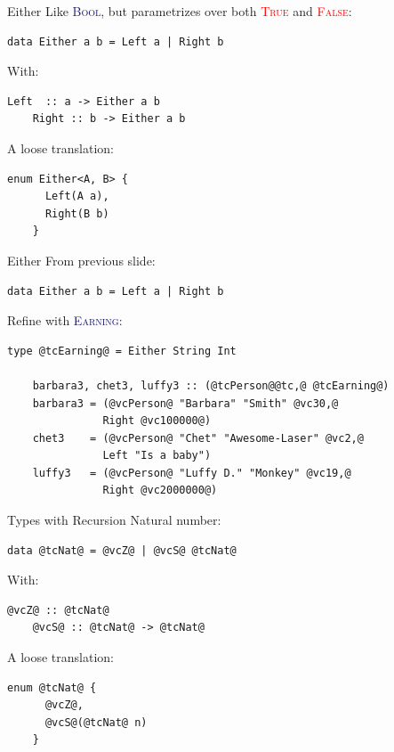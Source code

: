 \documentclass[xcolor={usenames,dvipsnames}]{beamer}
\newcommand{\htycon}[1]{\textcolor{MidnightBlue}{\textsc{#1}}}
\newcommand{\hvalcon}[1]{\textcolor{Red}{\textsc{#1}}}
\begin{document}
\begin{frame}[fragile]{Either}
  Like \htycon{Bool}, but parametrizes over both \hvalcon{True} and \hvalcon{False}:
  \begin{lstlisting}[style=hask]
    data Either a b = Left a | Right b
  \end{lstlisting}

  With:
  \begin{lstlisting}[style=hask]
    Left  :: a -> Either a b
    Right :: b -> Either a b
  \end{lstlisting}

  A loose translation:
  \begin{lstlisting}[style=hask]
    enum Either<A, B> {
      Left(A a),
      Right(B b)
    }
  \end{lstlisting}
\end{frame}

\begin{frame}[fragile]{Either}
  From previous slide:
  \begin{lstlisting}[style=hask]
    data Either a b = Left a | Right b
  \end{lstlisting}

  Refine with \htycon{Earning}:
  \begin{lstlisting}[style=hask]
    type @tcEarning@ = Either String Int

    barbara3, chet3, luffy3 :: (@tcPerson@@tc,@ @tcEarning@)
    barbara3 = (@vcPerson@ "Barbara" "Smith" @vc30,@
               Right @vc100000@)
    chet3    = (@vcPerson@ "Chet" "Awesome-Laser" @vc2,@
               Left "Is a baby") 
    luffy3   = (@vcPerson@ "Luffy D." "Monkey" @vc19,@
               Right @vc2000000@)
  \end{lstlisting}
\end{frame}

\begin{frame}[fragile]{Types with Recursion}
  Natural number:
  \begin{lstlisting}[style=hask]
    data @tcNat@ = @vcZ@ | @vcS@ @tcNat@
  \end{lstlisting}

  With:
  \begin{lstlisting}[style=hask]
    @vcZ@ :: @tcNat@
    @vcS@ :: @tcNat@ -> @tcNat@
  \end{lstlisting}

  A loose translation:
  \begin{lstlisting}[style=hask]
    enum @tcNat@ {
      @vcZ@,
      @vcS@(@tcNat@ n)
    }
  \end{lstlisting}
\end{frame}
\end{document}
